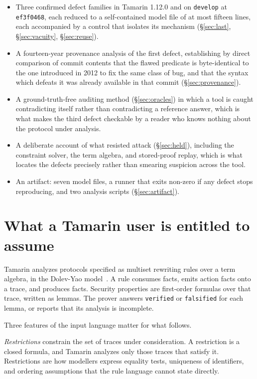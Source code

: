 \documentclass[version=preprint]{iacrcc}
\newcommand{\code}[1]{\texttt{\small #1}}
\theoremstyle{definition}
\theoremstyle{remark}
\begin{document}
\begin{itemize}
	\item Three confirmed defect families in Tamarin 1.12.0 and on
	      \code{develop} at \code{ef3f0468}, each reduced to a self-contained model
	      file of at most fifteen lines, each accompanied by a control that isolates
	      its mechanism (\S\ref{sec:last}, \S\ref{sec:vacuity}, \S\ref{sec:reuse}).
	\item A fourteen-year provenance analysis of the first defect, establishing
	      by direct comparison of commit contents that the flawed predicate is
	      byte-identical to the one introduced in 2012 to fix the same class of bug,
	      and that the syntax which defeats it was already available in that commit
	      (\S\ref{sec:provenance}).
	\item A ground-truth-free auditing method (\S\ref{sec:oracles}) in which a
	      tool is caught contradicting itself rather than contradicting a reference
	      answer, which is what makes the third defect checkable by a reader who
	      knows nothing about the protocol under analysis.
	\item A deliberate account of what resisted attack (\S\ref{sec:held}),
	      including the constraint solver, the term algebra, and stored-proof replay,
	      which is what locates the defects precisely rather than smearing suspicion
	      across the tool.
	\item An artifact: seven model files, a runner that exits non-zero if any
	      defect stops reproducing, and two analysis scripts (\S\ref{sec:artifact}).
\end{itemize}

\section{What a Tamarin user is entitled to assume}\label{sec:background}

Tamarin analyzes protocols specified as multiset rewriting rules over a term
algebra, in the Dolev-Yao model~\cite{DolevYao}. A rule consumes facts, emits
action facts onto a trace, and produces facts. Security properties are
first-order formulas over that trace, written as lemmas. The prover answers
\code{verified} or \code{falsified} for each lemma, or reports that its analysis
is incomplete.

Three features of the input language matter for what follows.

\emph{Restrictions} constrain the set of traces under consideration. A
restriction is a closed formula, and Tamarin analyzes only those traces that
satisfy it. Restrictions are how modellers express equality tests, uniqueness
of identifiers, and ordering assumptions that the rule language cannot state
directly.
\end{document}
